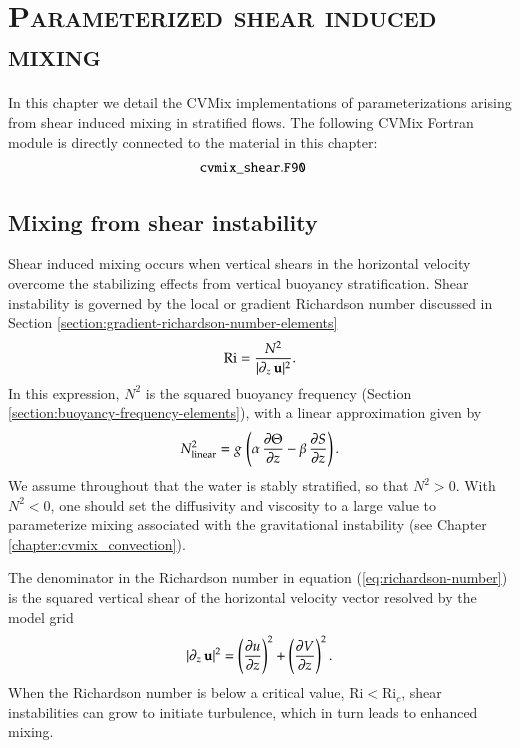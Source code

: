 \chapter{\scshape Parameterized shear induced mixing}
\label{chapter:cvmix_shear}

\minitoc
\vspace{.5cm}

In this chapter we detail the CVMix implementations of
parameterizations arising from shear induced mixing in stratified
flows.  The following CVMix Fortran module is directly connected to
the material in this chapter:
\begin{align*} 
 &{\tt cvmix\_shear.F90}
\end{align*}


\section{Mixing from shear instability}
\label{section:shear-instability-mixing}

Shear induced mixing occurs when vertical shears in the horizontal
velocity overcome the stabilizing effects from vertical buoyancy
stratification.  Shear instability is governed by the local or
gradient Richardson number discussed in Section
\ref{section:gradient-richardson-number-elements}
\begin{equation}
 \mbox{Ri} = \frac{N^{2}}{|\partial_{z} \, {\bf u}|^{2} }.
\label{eq:richardson-number}
\end{equation}
In this expression, $N^{2}$ is the squared buoyancy frequency (Section
\ref{section:buoyancy-frequency-elements}), with a linear
approximation given by
\begin{equation}
 N^{2}_{\mbox{\scriptsize linear}} 
 = g \, \left( \alpha \, \frac{\partial \Theta}{\partial z} 
                         - \beta  \, \frac{\partial S}{\partial z} \right).
\label{eq:buoyancy-frequency-shear}
\end{equation}
We assume throughout that the water is stably stratified, so that
$N^{2} > 0$.  With $N^{2} < 0$, one should set the diffusivity and
viscosity to a large value to parameterize mixing associated with the
gravitational instability (see Chapter
\ref{chapter:cvmix_convection}).

The denominator in the Richardson number in equation
(\ref{eq:richardson-number}) is the squared vertical shear of the
horizontal velocity vector resolved by the model grid
\begin{equation}
 |\partial_{z} \, {\bf u}|^{2}  =
  \left( \frac{\partial u}{\partial z} \right)^{2} 
 +
 \left( \frac{\partial V}{\partial z} \right)^{2}. 
\end{equation}
When the Richardson number is below a critical value, $\mbox{Ri} <
\mbox{Ri}_{c}$, shear instabilities can grow to initiate turbulence,
which in turn leads to enhanced mixing.

